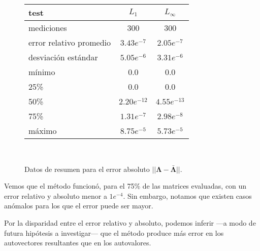 \vspace{1em}
\begin{figure}[!htbp]
    \begin{tabular}{ |l|c|c| } 
    \hline
    test                    & $L_1$             & $L_\infty$ \\
    \hline
    mediciones              & 300               & 300 \\
    error relativo promedio & $3.43e^{-7}$  & $2.05e^{-7}$ \\
    desviación estándar     & $5.05e^{-6}$  & $3.31e^{-6}$ \\
    mínimo                  & 0.0               & 0.0 \\
    25\%                    & 0.0               & 0.0 \\
    50\%                    & $2.20e^{-12}$ & $4.55e^{-13}$ \\
    75\%                    & $1.31e^{-7}$  & $2.98e^{-8}$ \\
    máximo                  & $8.75e^{-5}$  & $5.73e^{-5}$ \\
    \hline
    \end{tabular} \\
    \bigskip
    \caption{Datos de resumen para el error absoluto $||\mathbf{\Lambda} - \mathbf{\bar{\Lambda}}||$.} \label{error_absoluto}
\end{figure}

\vspace{1em}
Vemos que el método funcionó, para el 75\% de las matrices evaluadas, con un error relativo y absoluto menor a $1e^{-4}$. Sin embargo, notamos que existen casos anómalos para los que el error puede ser mayor.

Por la disparidad entre el error relativo y absoluto, podemos inferir ---a modo de futura hipótesis a investigar--- que el método produce más error en los autovectores resultantes que en los autovalores.
